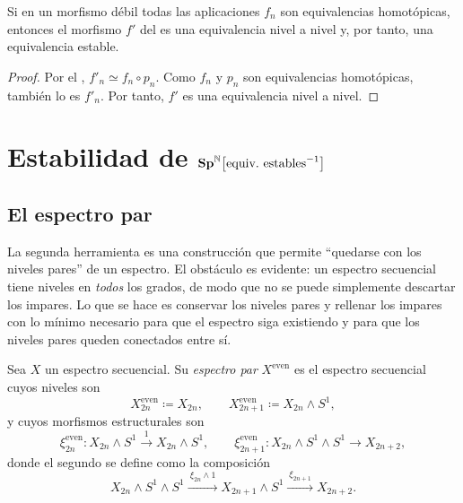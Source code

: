 \begin{coro}\label{coro:debil-equivalencia}
Si en un morfismo débil todas las aplicaciones $f_n$ son equivalencias homotópicas, entonces el morfismo $f'$ del  es una equivalencia nivel a nivel y, por tanto, una equivalencia estable.
\end{coro}
\begin{proof}
Por el , $f'_n\simeq f_n\circ p_n$. Como $f_n$ y $p_n$ son equivalencias homotópicas, también lo es $f'_n$. Por tanto, $f'$ es una equivalencia nivel a nivel.
\end{proof}

\section{Estabilidad de \texorpdfstring{$\Sp^{\mathbb{N}}\bigl[\text{equiv.\ estables}^{-1}\bigr]$}{Sp[1/equiv. estables]} }

\subsection{El espectro par}

La segunda herramienta es una construcción que permite ``quedarse con los niveles pares'' de un espectro. El obstáculo es evidente: un espectro secuencial tiene niveles en \emph{todos} los grados, de modo que no se puede simplemente descartar los impares. Lo que se hace es conservar los niveles pares y rellenar los impares con lo mínimo necesario para que el espectro siga existiendo y para que los niveles pares queden conectados entre sí.

\begin{defi}\label{defi:espectro-par}
Sea $X$ un espectro secuencial. Su \emph{espectro par} $X^{\mathrm{even}}$ es el espectro secuencial cuyos niveles son
\[
X^{\mathrm{even}}_{2n}\coloneqq X_{2n},
\qquad
X^{\mathrm{even}}_{2n+1}\coloneqq X_{2n}\wedge S^1,
\]
y cuyos morfismos estructurales son
\[
\xi^{\mathrm{even}}_{2n}\colon X_{2n}\wedge S^1\xrightarrow{\ 1\ }X_{2n}\wedge S^1 ,
\qquad
\xi^{\mathrm{even}}_{2n+1}\colon X_{2n}\wedge S^1\wedge S^1\longrightarrow X_{2n+2},
\]
donde el segundo se define como la composición
\[
X_{2n}\wedge S^1\wedge S^1\xrightarrow{\ \xi_{2n}\wedge1\ }X_{2n+1}\wedge S^1\xrightarrow{\ \xi_{2n+1}\ }X_{2n+2}.
\]
\end{defi}

